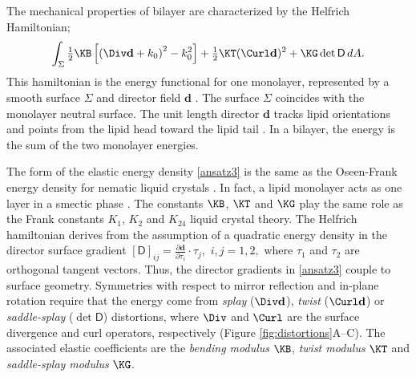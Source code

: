 The mechanical properties of bilayer are characterized by the Helfrich Hamiltonian;
\begin{equation}
\label{ansatz3}
\begin{aligned}
\int_{\Sigma} 
 \tfrac{1}{2}\KB\left[ \left( \Div \mathbf{d} + k_0\right)^2 - k_0^2\right] 
+ \tfrac{1}{2}\KT (\Curl \mathbf{d})^2 + \KG  \det \mathsf{D} \,dA.
\end{aligned}
\end{equation}
This hamiltonian is the energy functional for one monolayer,
represented by a smooth surface $\Sigma$ and director field $\mathbf{d}$
 \cite{Helfrich73, PhysRevLett.113.248102, Hamm2000}.
The surface $\Sigma$ coincides with the monolayer neutral surface. The 
unit length director $\mathbf{d}$ tracks lipid orientations  
and points from the lipid head toward the lipid tail \cite{doi:10.1021/jp075641w,KLAUDA20083074}.
In a bilayer, the energy is the sum of the two monolayer energies. 

The form of the elastic energy density \eqref{ansatz3} is the same as
the Oseen-Frank energy density for nematic liquid crystals \cite{ANDRIENKO2018520,Tran7106}.  In fact,  
a lipid monolayer acts as one layer in a smectic  phase \cite{REYESMATEO1995978,Rangamani20140463,PhysRevLett.113.248102}. 
The constants $\KB$, $\KT$  and $\KG$ play the same role as the Frank constants $K_1$, $K_2$ and $K_{24}$
liquid crystal theory. 
The Helfrich hamiltonian derives from the assumption of a quadratic energy density
in the director surface gradient 
$[\mathsf{D}]_{ij} = \frac{\partial \mathbf{d} }{\partial \tau_i} \cdot \tau_j,$ $i,j = 1,2,$ 
where $\tau_1$ and $\tau_2$ are orthogonal tangent vectors. Thus, the 
director gradients in \eqref{ansatz3} couple to surface geometry. 
Symmetries  with respect to mirror reflection and in-plane rotation 
require that the energy come from
\emph{splay} ($\Div \mathbf{d}$), 
\emph{twist} ($\Curl \mathbf{d}$)
or \emph{saddle-splay} ($\det \mathsf{D}$) distortions,
where $\Div$ and $\Curl$ are the surface divergence  and curl  operators, respectively (Figure \ref{fig:distortions}A--C).
The associated elastic coefficients  are the \emph{bending modulus} $\KB$,  \emph{twist modulus} $\KT$ 
and \emph{saddle-splay modulus} $\KG$.

